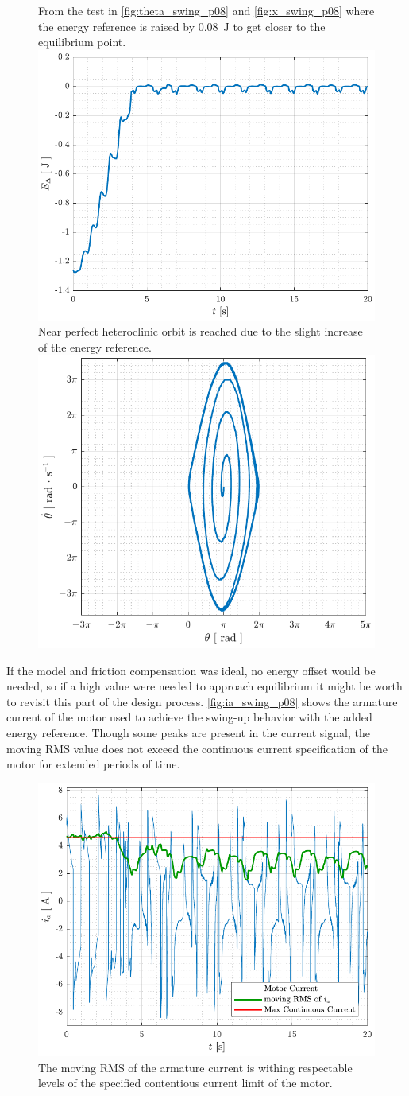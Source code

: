 \begin{figure}[H]
  \hspace{1cm}
  \captionbox
  {
    From the test in \autoref{fig:theta_swing_p08} and \ref{fig:x_swing_p08} where the energy reference is raised by \SI{0.08}{J} to get closer to the equilibrium point.
    \label{fig:Edelta_swing_p08}
  }
  {
    \hspace{-1cm}
    \includegraphics[width=.4\textwidth]{figures/Edelta_swing_p08}
  }
  \hspace{20pt}
  \captionbox 
  {
    Near perfect heteroclinic orbit is reached due to the slight increase of the energy reference.
    \label{fig:phase_swing_p08}
  }
  {
    \hspace{-1cm}
    \includegraphics[width=.364\textwidth]{figures/phase_swing_p08}
  }  
\end{figure}
If the model and friction compensation was ideal, no energy offset would be needed, so if a high value were needed to approach equilibrium it might be worth to revisit this part of the design process.
%
\autoref{fig:ia_swing_p08} shows the armature current of the motor used to achieve the swing-up behavior with the added energy reference. Though some peaks are present in the current signal, the moving RMS value does not exceed the continuous current specification of the motor for extended periods of time.
\begin{figure}[H]
  \includegraphics[width=.42\textwidth]{figures/ia_swing_p08}
  \caption{The moving RMS of the armature current is withing respectable levels of the specified contentious current limit of the motor.}
  \label{fig:ia_swing_p08}
\end{figure}
